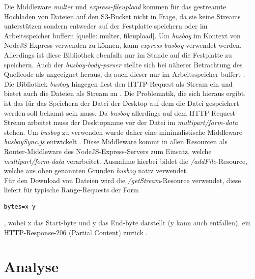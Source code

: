 \documentclass[a4paper, 12pt]{scrreprt}
\renewcommand\_{\textunderscore\allowbreak}
\begin{document}
\noindent Die Middleware \textit{multer} und \textit{express-fileupload} kommen für das gestreamte Hochladen von Dateien auf den S3-Bucket nicht in Frage, da sie keine Streams unterstützen sondern entweder auf der Festplatte speichern  oder im Arbeitsspeicher buffern [quelle: multer, fileupload].
Um \textit{busboy} im Kontext von NodeJS-Express verwenden zu können, kann \textit{express-busboy} verwendet werden. Allerdings ist diese Bibliothek ebenfalls nur im Stande auf die Festplatte zu speichern. Auch der \textit{busboy-body-parser} stellte sich bei näherer Betrachtung des Quellcode als ungeeignet heraus, da auch dieser nur im Arbeitsspeicher buffert \cite{LeonardMartin}.\\
Die Bibliothek \textit{busboy} hingegen liest den HTTP-Request als Stream ein und bietet auch die Dateien als Stream an \cite{busboy}.
Die Problematik, die sich hieraus ergibt, ist das für das Speichern der Datei der Desktop auf dem die Datei gespeichert werden soll bekannt sein muss. Da \textit{busboy} allerdings auf dem HTTP-Request-Stream arbeitet muss der Desktopname vor der Datei im \textit{multipart/form-data} stehen. Um \textit{busboy} zu verwenden wurde daher eine minimalistische Middleware \textit{busboySync.js} entwickelt \cite{Express}.
Diese Middleware kommt in allen Resourcen als Router-Middleware des NodeJS-Express-Servers zum Einsatz, welche \textit{multipart/form-data} verarbeitet. Ausnahme hierbei bildet die \textit{/addFile}-Resource, welche aus oben genannten Gründen \textit{busboy} nativ verwendet.\\
Für den Download von Dateien wird die \textit{/getStream}-Resource verwendet, diese liefert für typische Range-Requests der Form
\begin{lstlisting}
bytes=x-y
\end{lstlisting}
, wobei x das Start-byte und y das End-byte darstellt (y kann auch entfallen), ein HTTP-Response-206 (Partial Content) zurück \cite{HTP}.


\chapter{Analyse}
\end{document}
